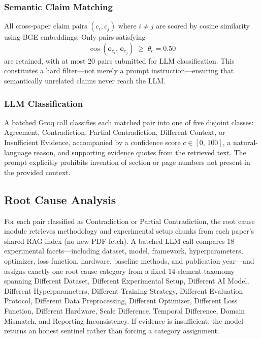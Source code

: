 \documentclass[conference]{IEEEtran}
\begin{document}
\subsubsection{Semantic Claim Matching}
All cross-paper claim pairs $(c_i, c_j)$ where $i \ne j$ are scored by
cosine similarity using BGE embeddings. Only pairs satisfying
\begin{equation}
    \cos\!\left(\mathbf{e}_{c_i},\, \mathbf{e}_{c_j}\right) \;\ge\; \theta_c = 0.50
\label{eq:threshold}
\end{equation}
are retained, with at most 20 pairs submitted for LLM classification.
This constitutes a hard filter---not merely a prompt instruction---ensuring
that semantically unrelated claims never reach the LLM.

\subsubsection{LLM Classification}
A batched Groq call classifies each matched pair into one of five disjoint
classes: Agreement, Contradiction, Partial Contradiction, Different Context,
or Insufficient Evidence, accompanied by a confidence score
$c \in [0,\,100]$, a natural-language reason, and supporting evidence
quotes from the retrieved text. The prompt explicitly prohibits invention of
section or page numbers not present in the provided context.

\subsection{Root Cause Analysis}

For each pair classified as Contradiction or Partial Contradiction, the
root cause module retrieves methodology and experimental setup chunks from
each paper's shared RAG index (no new PDF fetch). A batched LLM call
compares 18 experimental facets---including dataset, model, framework,
hyperparameters, optimizer, loss function, hardware, baseline methods, and
publication year---and assigns exactly one root cause category from a fixed
14-element taxonomy spanning Different Dataset, Different Experimental Setup,
Different AI Model, Different Hyperparameters, Different Training Strategy,
Different Evaluation Protocol, Different Data Preprocessing, Different
Optimizer, Different Loss Function, Different Hardware, Scale Difference,
Temporal Difference, Domain Mismatch, and Reporting Inconsistency.
If evidence is insufficient, the model returns an honest sentinel rather than
forcing a category assignment.
\end{document}
